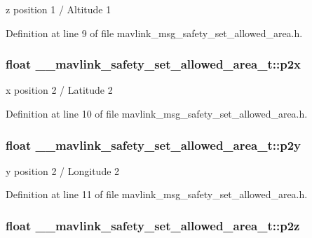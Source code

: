 z position 1 / Altitude 1 



Definition at line 9 of file mavlink\-\_\-msg\-\_\-safety\-\_\-set\-\_\-allowed\-\_\-area.\-h.

\hypertarget{struct____mavlink__safety__set__allowed__area__t_aca63129651b0cc2d7394216782d9f721}{
\subsubsection[{p2x}]{\setlength{\rightskip}{0pt plus 5cm}float \-\_\-\-\_\-mavlink\-\_\-safety\-\_\-set\-\_\-allowed\-\_\-area\-\_\-t\-::p2x}}\label{struct____mavlink__safety__set__allowed__area__t_aca63129651b0cc2d7394216782d9f721}


x position 2 / Latitude 2 



Definition at line 10 of file mavlink\-\_\-msg\-\_\-safety\-\_\-set\-\_\-allowed\-\_\-area.\-h.

\hypertarget{struct____mavlink__safety__set__allowed__area__t_a6cab84234ced01ba0108e81a0147df09}{
\subsubsection[{p2y}]{\setlength{\rightskip}{0pt plus 5cm}float \-\_\-\-\_\-mavlink\-\_\-safety\-\_\-set\-\_\-allowed\-\_\-area\-\_\-t\-::p2y}}\label{struct____mavlink__safety__set__allowed__area__t_a6cab84234ced01ba0108e81a0147df09}


y position 2 / Longitude 2 



Definition at line 11 of file mavlink\-\_\-msg\-\_\-safety\-\_\-set\-\_\-allowed\-\_\-area.\-h.

\hypertarget{struct____mavlink__safety__set__allowed__area__t_a9609ca1370ee08e0acfb658d37bfa6d1}{
\subsubsection[{p2z}]{\setlength{\rightskip}{0pt plus 5cm}float \-\_\-\-\_\-mavlink\-\_\-safety\-\_\-set\-\_\-allowed\-\_\-area\-\_\-t\-::p2z}}\label{struct____mavlink__safety__set__allowed__area__t_a9609ca1370ee08e0acfb658d37bfa6d1}


